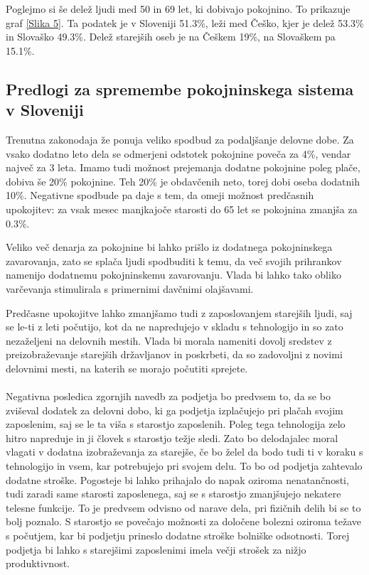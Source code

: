 \documentclass[12pt, a4paper]{article}
\begin{document}
\hspace*{5mm} Poglejmo si še delež ljudi med 50 in 69 let, ki dobivajo pokojnino. To prikazuje graf \ref{Slika 5}. Ta podatek je v Sloveniji 51.3\%, leži med Češko, kjer je delež 53.3\% in Slovaško 49.3\%. Delež starejših oseb je na Češkem 19\%, na Slovaškem pa 15.1\%.

\newpage
\subsection[Predolgi za spremembe pokojninskega sistema v Sloveniji]{Predlogi za spremembe pokojninskega sistema v Sloveniji}

\hspace*{5mm} Trenutna zakonodaja že ponuja veliko spodbud za podaljšanje delovne dobe. Za vsako dodatno leto dela se odmerjeni odstotek pokojnine poveča za 4\%, vendar največ za 3 leta. Imamo tudi možnost prejemanja dodatne pokojnine poleg plače, dobiva še 20\% pokojnine. Teh 20\% je obdavčenih neto, torej dobi oseba dodatnih 10\%. Negativne spodbude pa daje s tem, da omeji možnost predčasnih upokojitev: za vsak mesec manjkajoče starosti do 65 let se pokojnina zmanjša za 0.3\%.

\hspace*{5mm} Veliko več denarja za pokojnine bi lahko prišlo iz dodatnega pokojninskega zavarovanja, zato se splača ljudi spodbuditi k temu, da več svojih prihrankov namenijo dodatnemu pokojninskemu zavarovanju. Vlada bi lahko tako obliko varčevanja stimulirala s primernimi davčnimi olajšavami.\par

\hspace*{5mm} Predčasne upokojitve lahko zmanjšamo tudi z zaposlovanjem starejših ljudi, saj se le-ti z leti počutijo, kot da ne napredujejo v skladu s tehnologijo in so zato nezaželjeni na delovnih mestih. Vlada bi morala nameniti dovolj sredstev z preizobraževanje starejših državljanov in poskrbeti, da so zadovoljni z novimi delovnimi mesti, na katerih se morajo počutiti sprejete.
\\
\\
\hspace*{5mm} Negativna posledica zgornjih navedb za podjetja bo predvsem to, da se bo zviševal dodatek za delovni dobo, ki ga podjetja izplačujejo pri plačah svojim zaposlenim, saj se le ta viša s starostjo zaposlenih. Poleg tega tehnologija zelo hitro napreduje in ji človek s starostjo težje sledi. Zato bo delodajalec moral vlagati v  dodatna izobraževanja za starejše, če bo želel da bodo tudi ti v koraku s tehnologijo in vsem, kar potrebujejo pri svojem delu. To bo od podjetja zahtevalo dodatne stroške. Pogosteje bi lahko prihajalo do napak oziroma nenatančnosti, tudi zaradi same starosti zaposlenega, saj se s starostjo zmanjšujejo nekatere telesne funkcije. To je predvsem odvisno od narave dela, pri fizičnih delih bi se to bolj poznalo. S starostjo se povečajo možnosti za določene bolezni oziroma težave s počutjem, kar bi podjetju prineslo dodatne stroške bolniške odsotnosti. Torej podjetja bi lahko s starejšimi zaposlenimi imela večji strošek za nižjo produktivnost.
\end{document}
